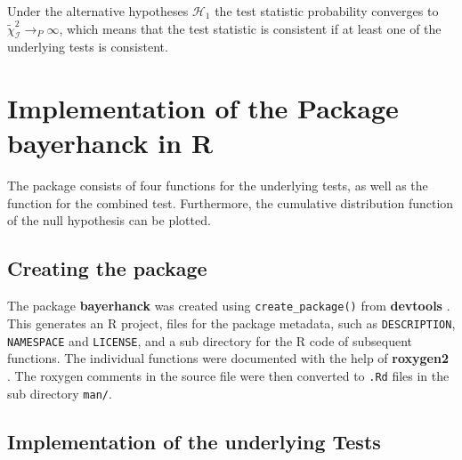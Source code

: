 \documentclass[12pt,a4paper]{article}
\begin{document}
Under the alternative hypotheses \(\mathcal{H}_1\) the test statistic
probability converges to
\(\tilde{\chi}_{\mathcal{I}}^{2} \rightarrow_P \infty\), which means
that the test statistic is consistent if at least one of the underlying
tests is consistent.

\hypertarget{implementation-of-the-package-bayerhanck-in-r}{%
\section{\texorpdfstring{Implementation of the Package
\textbf{bayerhanck} in
R}{Implementation of the Package bayerhanck in R}}\label{implementation-of-the-package-bayerhanck-in-r}}

The package consists of four functions for the underlying tests, as well
as the function for the combined test. Furthermore, the cumulative
distribution function of the null hypothesis can be plotted.

\hypertarget{creating-the-package}{%
\subsection{Creating the package}\label{creating-the-package}}

The package \textbf{bayerhanck} was created using
\texttt{create\_package()} from \textbf{devtools}
\autocite{hester_devtools_2020}. This generates an R project, files for
the package metadata, such as \texttt{DESCRIPTION}, \texttt{NAMESPACE}
and \texttt{LICENSE}, and a sub directory for the R code of subsequent
functions. The individual functions were documented with the help of
\textbf{roxygen2} \autocite{wickham_roxygen2_2020}. The roxygen comments
in the source file were then converted to \texttt{.Rd} files in the sub
directory \texttt{man/}.

\hypertarget{implementation-of-the-underlying-tests}{%
\subsection{Implementation of the underlying
Tests}\label{implementation-of-the-underlying-tests}}
\end{document}

